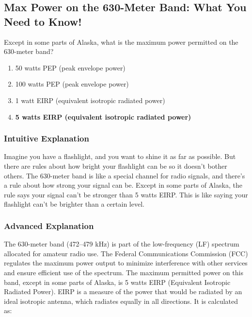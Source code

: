 \subsection{Max Power on the 630-Meter Band: What You Need to Know!}

\begin{tcolorbox}[colback=gray!10!white,colframe=black!75!black,title=E1A09] Except in some parts of Alaska, what is the maximum power permitted on the 630-meter band?
    \begin{enumerate}[label=\Alph*),noitemsep]
        \item 50 watts PEP (peak envelope power)
        \item 100 watts PEP (peak envelope power)
        \item 1 watt EIRP (equivalent isotropic radiated power)
        \item \textbf{5 watts EIRP (equivalent isotropic radiated power)}
    \end{enumerate}
\end{tcolorbox}

\subsubsection{Intuitive Explanation}
Imagine you have a flashlight, and you want to shine it as far as possible. But there are rules about how bright your flashlight can be so it doesn’t bother others. The 630-meter band is like a special channel for radio signals, and there’s a rule about how strong your signal can be. Except in some parts of Alaska, the rule says your signal can’t be stronger than 5 watts EIRP. This is like saying your flashlight can’t be brighter than a certain level.

\subsubsection{Advanced Explanation}
The 630-meter band (472–479 kHz) is part of the low-frequency (LF) spectrum allocated for amateur radio use. The Federal Communications Commission (FCC) regulates the maximum power output to minimize interference with other services and ensure efficient use of the spectrum. The maximum permitted power on this band, except in some parts of Alaska, is 5 watts EIRP (Equivalent Isotropic Radiated Power). EIRP is a measure of the power that would be radiated by an ideal isotropic antenna, which radiates equally in all directions. It is calculated as:

